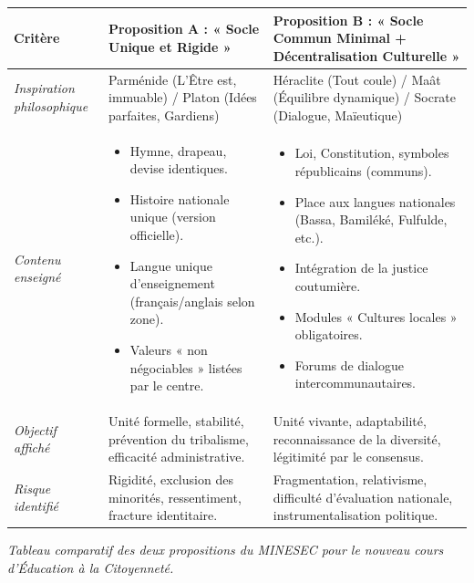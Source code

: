 \documentclass[11pt]{article}
\begin{document}
\begin{center}
\begin{tabularx}{\linewidth}{|l|X|X|}
\hline
\rowcolor{popblueL}
\textbf{Critère} & \textbf{Proposition A : « Socle Unique et Rigide »} & \textbf{Proposition B : « Socle Commun Minimal + Décentralisation Culturelle »} \\
\hline
\emph{Inspiration philosophique} & Parménide (L'Être est, immuable) / Platon (Idées parfaites, Gardiens) & Héraclite (Tout coule) / Maât (Équilibre dynamique) / Socrate (Dialogue, Maïeutique) \\
\hline
\emph{Contenu enseigné} & \begin{itemize}\item Hymne, drapeau, devise identiques.\item Histoire nationale unique (version officielle).\item Langue unique d'enseignement (français/anglais selon zone).\item Valeurs « non négociables » listées par le centre.\end{itemize} & \begin{itemize}\item Loi, Constitution, symboles républicains (communs).\item Place aux langues nationales (Bassa, Bamiléké, Fulfulde, etc.).\item Intégration de la justice coutumière.\item Modules « Cultures locales » obligatoires.\item Forums de dialogue intercommunautaires.\end{itemize} \\
\hline
\emph{Objectif affiché} & Unité formelle, stabilité, prévention du tribalisme, efficacité administrative. & Unité vivante, adaptabilité, reconnaissance de la diversité, légitimité par le consensus. \\
\hline
\emph{Risque identifié} & Rigidité, exclusion des minorités, ressentiment, fracture identitaire. & Fragmentation, relativisme, difficulté d'évaluation nationale, instrumentalisation politique. \\
\hline
\end{tabularx}
\end{center}
\par\medskip\noindent\textit{Tableau comparatif des deux propositions du MINESEC pour le nouveau cours d'Éducation à la Citoyenneté.}\par\medskip
\end{document}
